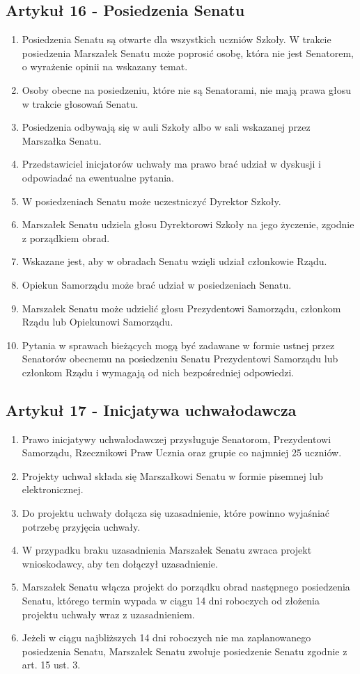 \documentclass[14pt]{article}
\newenvironment{ustepy}{%
	\begin{enumerate}[leftmargin=1.5em, itemindent=1pt, labelwidth=1em, itemsep=5pt]
	}{%
	\end{enumerate}
}
\begin{document}
\subsection*{Artykuł 16 - Posiedzenia Senatu}
\begin{ustepy}
	\item Posiedzenia Senatu są otwarte dla wszystkich uczniów Szkoły. W trakcie posiedzenia Marszałek Senatu może poprosić osobę, która nie jest Senatorem, o wyrażenie opinii na wskazany temat.
	\item Osoby obecne na posiedzeniu, które nie są Senatorami, nie mają prawa głosu w trakcie głosowań Senatu. 
	\item Posiedzenia odbywają się w auli Szkoły albo w sali wskazanej przez Marszałka Senatu.
	\item Przedstawiciel inicjatorów uchwały ma prawo brać udział w dyskusji i odpowiadać na ewentualne pytania.
	\item W posiedzeniach Senatu może uczestniczyć Dyrektor Szkoły.
	\item Marszałek Senatu udziela głosu Dyrektorowi Szkoły na jego życzenie, zgodnie z porządkiem obrad. 
	\item Wskazane jest, aby w obradach Senatu wzięli udział członkowie Rządu.
	\item Opiekun Samorządu może brać udział w posiedzeniach Senatu.
	\item Marszałek Senatu może udzielić głosu Prezydentowi Samorządu, członkom Rządu lub Opiekunowi Samorządu.
	\item Pytania w sprawach bieżących mogą być zadawane w formie ustnej przez Senatorów obecnemu na posiedzeniu Senatu Prezydentowi Samorządu lub członkom Rządu i wymagają od nich bezpośredniej odpowiedzi.
\end{ustepy}
\subsection*{Artykuł 17 - Inicjatywa uchwałodawcza}
\begin{ustepy}
	\item Prawo inicjatywy uchwałodawczej przysługuje Senatorom, Prezydentowi Samorządu, Rzecznikowi Praw Ucznia oraz grupie co najmniej 25 uczniów.
	\item Projekty uchwał składa się Marszałkowi Senatu w formie pisemnej lub elektronicznej.
	\item Do projektu uchwały dołącza się uzasadnienie, które powinno wyjaśniać potrzebę przyjęcia uchwały.
	\item W przypadku braku uzasadnienia Marszałek Senatu zwraca projekt wnioskodawcy, aby ten dołączył uzasadnienie.
	\item Marszałek Senatu włącza projekt do porządku obrad następnego posiedzenia Senatu, którego termin wypada w ciągu 14 dni roboczych od złożenia projektu uchwały wraz z uzasadnieniem.
	\item Jeżeli w ciągu najbliższych 14 dni roboczych nie ma zaplanowanego posiedzenia Senatu, Marszałek Senatu zwołuje posiedzenie Senatu zgodnie z art. 15 ust. 3.
\end{ustepy}
\newpage
\end{document}
